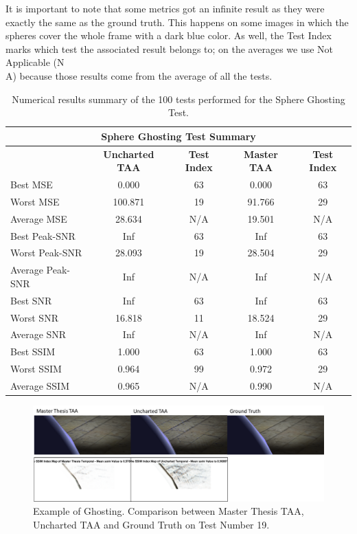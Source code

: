 \documentclass{cslthse-msc}
\begin{document}
It is important to note that some metrics got an infinite result as they were exactly the same as the ground truth. This happens on some images in which the spheres cover the whole frame with a dark blue color. As well, the Test Index marks which test the associated result belongs to; on the averages we use Not Applicable (N\\A) because those results come from the average of all the tests. 
\begin{table}[H]
	\small
	\centering
	\caption{Numerical results summary of the 100 tests performed for the Sphere Ghosting Test.}
	\begin{tabular}{|l|c|c|c|c|}
		\hline
		\multicolumn{5}{|c|}{\textbf{Sphere Ghosting Test Summary}} \\
		\hline
		\multicolumn{1}{|c|}{\textbf{\diagbox{Tests}{AA}}} & \textbf{Uncharted TAA} & \textbf{Test Index} & \textbf{Master TAA} & \textbf{Test Index} \\
		\hline
		Best MSE & 0.000 & 63 & 0.000 & 63 \\
		\hline
		Worst MSE & 100.871 & 19 & 91.766 & 29 \\
		\hline
		Average MSE & 28.634 & N/A   & 19.501 & N/A \\
		\hline
		Best Peak-SNR & Inf   & 63 & Inf   & 63 \\
		\hline
		Worst Peak-SNR & 28.093 & 19 & 28.504 & 29 \\
		\hline
		Average Peak-SNR  & Inf   & N/A   & Inf   & N/A \\
		\hline
		Best SNR & Inf   & 63 & Inf   & 63 \\
		\hline
		Worst SNR & 16.818 & 11 & 18.524 & 29 \\
		\hline
		Average SNR  & Inf   & N/A   & Inf   & N/A \\
		\hline
		Best SSIM & 1.000 & 63 & 1.000 & 63 \\
		\hline
		Worst SSIM & 0.964 & 99 & 0.972 & 29 \\
		\hline
		Average SSIM & 0.965 & N/A   & 0.990 & N/A \\
		\hline
	\end{tabular}%
	\label{tab:sphere_ghosting}%
\end{table}%

\begin{figure}[H]
	\centering
	\includegraphics[scale=0.8]{images/results/sphere_ghosting.png}
	\caption{Example of Ghosting. Comparison between Master Thesis TAA, Uncharted TAA and Ground Truth on Test Number 19.}\label{fig:sphere_ghosting}
\end{figure}
\end{document}
